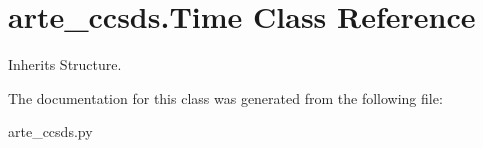 \section{arte\+\_\+ccsds.\+Time Class Reference}
\label{classarte__ccsds_1_1_time}


Inherits Structure.



The documentation for this class was generated from the following file\+:\begin{DoxyCompactItemize}
\item 
arte\+\_\+ccsds.\+py\end{DoxyCompactItemize}
